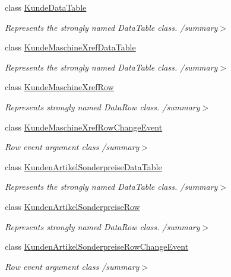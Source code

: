 \begin{DoxyCompactItemize}
class \hyperlink{class_products_1_1_data_1_1ds_sage_1_1_kunde_data_table}{Kunde\+Data\+Table}
\begin{DoxyCompactList}\small\item\em Represents the strongly named Data\+Table class. /summary$>$ \end{DoxyCompactList}\item 
class \hyperlink{class_products_1_1_data_1_1ds_sage_1_1_kunde_maschine_xref_data_table}{Kunde\+Maschine\+Xref\+Data\+Table}
\begin{DoxyCompactList}\small\item\em Represents the strongly named Data\+Table class. /summary$>$ \end{DoxyCompactList}\item 
class \hyperlink{class_products_1_1_data_1_1ds_sage_1_1_kunde_maschine_xref_row}{Kunde\+Maschine\+Xref\+Row}
\begin{DoxyCompactList}\small\item\em Represents strongly named Data\+Row class. /summary$>$ \end{DoxyCompactList}\item 
class \hyperlink{class_products_1_1_data_1_1ds_sage_1_1_kunde_maschine_xref_row_change_event}{Kunde\+Maschine\+Xref\+Row\+Change\+Event}
\begin{DoxyCompactList}\small\item\em Row event argument class /summary$>$ \end{DoxyCompactList}\item 
class \hyperlink{class_products_1_1_data_1_1ds_sage_1_1_kunden_artikel_sonderpreise_data_table}{Kunden\+Artikel\+Sonderpreise\+Data\+Table}
\begin{DoxyCompactList}\small\item\em Represents the strongly named Data\+Table class. /summary$>$ \end{DoxyCompactList}\item 
class \hyperlink{class_products_1_1_data_1_1ds_sage_1_1_kunden_artikel_sonderpreise_row}{Kunden\+Artikel\+Sonderpreise\+Row}
\begin{DoxyCompactList}\small\item\em Represents strongly named Data\+Row class. /summary$>$ \end{DoxyCompactList}\item 
class \hyperlink{class_products_1_1_data_1_1ds_sage_1_1_kunden_artikel_sonderpreise_row_change_event}{Kunden\+Artikel\+Sonderpreise\+Row\+Change\+Event}
\begin{DoxyCompactList}\small\item\em Row event argument class /summary$>$ \end{DoxyCompactList}\item 

\end{DoxyCompactItemize}
